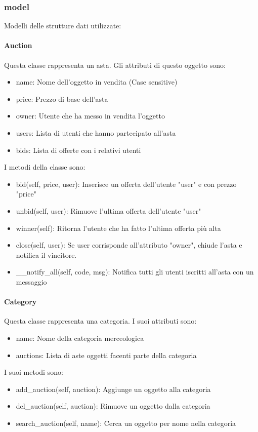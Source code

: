 \subsubsection{model}
Modelli delle strutture dati utilizzate:
\paragraph{\textbf{Auction}}
Questa classe rappresenta un asta. Gli attributi di questo oggetto sono:
\begin{itemize}
\item{name}: Nome dell'oggetto in vendita (Case sensitive)
\item{price}: Prezzo di base dell'asta
\item{owner}: Utente che ha messo in vendita l'oggetto
\item{users}: Lista di utenti che hanno partecipato all'asta
\item{bids}: Lista di offerte con i relativi utenti
\end{itemize}
I metodi della classe sono:
\begin{itemize}
\item {bid(self, price, user)}: Inserisce un offerta dell'utente "user" e con prezzo "price"
\item {unbid(self, user)}: Rimuove l'ultima offerta dell'utente "user"
\item {winner(self)}: Ritorna l'utente che ha fatto l'ultima offerta più alta
\item {close(self, user)}: Se user corrisponde all'attributo "owner", chiude l'asta e notifica il vincitore.
\item {\_\_notify\_all(self, code, msg)}: Notifica tutti gli utenti iscritti all'asta con un messaggio
\end{itemize}
\paragraph{\textbf{Category}}
Questa classe rappresenta una categoria. I suoi attributi sono: 
\begin{itemize}
\item{name}: Nome della categoria merceologica
\item{auctions}: Lista di aste oggetti facenti parte della categoria
\end{itemize}
I suoi metodi sono:
\begin{itemize}
\item{add\_auction(self, auction)}: Aggiunge un oggetto alla categoria
\item{del\_auction(self, auction)}: Rimuove un oggetto dalla categoria
\item{search\_auction(self, name)}: Cerca un oggetto per nome nella categoria
\end{itemize}
